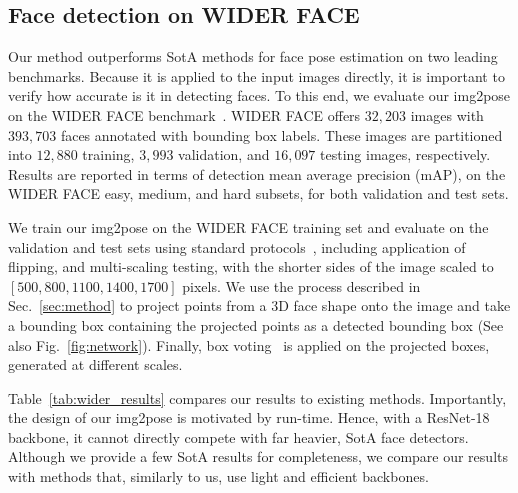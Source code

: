 \documentclass[final]{cvpr}
\newcommand{\minisection}[1]{\vspace{1mm}\noindent{\textbf{#1}.}}
\begin{document}
\subsection{Face detection on WIDER FACE}\label{sec:WIDER}
Our method outperforms SotA methods for face pose estimation on two leading benchmarks. Because it is applied to the input images directly, it is important to verify how accurate is it in detecting faces. To this end, we evaluate our img2pose on the WIDER FACE benchmark~\cite{wider_face}. WIDER FACE offers $32,203$ images with $393,703$ faces annotated with bounding box labels. These images are partitioned into $12,880$ training, $3,993$ validation, and $16,097$ testing images, respectively. Results are reported in terms of detection mean average precision (mAP), on the WIDER FACE easy, medium, and hard subsets, for both validation and test sets.

We train our img2pose on the WIDER FACE training set and evaluate on the validation and test sets using standard protocols~\cite{retinaface, ssh_face, s3_face}, including application of flipping, and multi-scaling testing, with the shorter sides of the image scaled to  $[500, 800, 1100, 1400, 1700]$ pixels. We use the process described in Sec.~\ref{sec:method} to project points from a 3D face shape onto the image and take a bounding box containing the projected points as a detected bounding box (See also Fig.~\ref{fig:network}). Finally, box voting~\cite{gidaris2015object} is applied on the projected boxes, generated at different scales.

\begin{figure*}[!ht]
\end{figure*}


\minisection{WIDER FACE detection results} Table~\ref{tab:wider_results} compares our results to existing methods. Importantly, the design of our img2pose is motivated by run-time. Hence, with a ResNet-18 backbone, it cannot directly compete with far heavier, SotA face detectors. Although we provide a few SotA results for completeness, we compare our results with methods that, similarly to us, use light and efficient backbones. 
\end{document}
